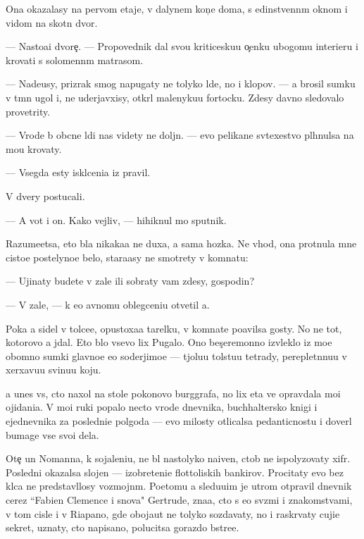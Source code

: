 \documentclass[10pt]{book}
\begin{document}
Ona okazalasy na pervom etaje, v dalynem kon{\c}e doma, s {\y}edinstvenn{\yi}m oknom i vidom na skotn{\yi}{\y} dvor.

— Nasto{\y}a{\x}i{\y} dvore{\c}. — Pro\-po\-ved\-nik dal svo{\y}u kriticesku{\y}u o{\c}enku ubogomu interieru i krovati s solomenn{\yi}m matrasom.

— Nade{\y}usy, prizrak smog napugaty ne tolyko l{\io}de{\y}, no i klopov. — {\Y}a brosil sumku v t{\e}mn{\yi}{\y} ugol i, ne uderjavxisy, otkr{\yi}l malenyku{\y}u fortocku. Zdesy davno sledovalo provetrity.

— Vrode b{\yi} ob{\yi}cn{\yi}{\y}e l{\io}di nas videty ne doljn{\yi}. — {\Y}evo pelikan{\y}e sv{\ia}\-te{\y}\-xestvo pl{\io}hnulsa na mo{\y}u krovaty.

— Vsegda {\y}esty iskl{\io}ceni{\y}a iz pravil.

V dvery postucali.

— A vot i on. Kako{\y} vejliv{\yi}{\y}, — hihiknul mo{\y} sputnik.

Razume{\y}etsa, eto b{\yi}la nikaka{\y}a ne duxa, a sama hoz{\ia}{\y}ka. Ne vhod{\ia}, ona pro\-t{\ia}\-nu\-la mne cisto{\y}e postelyno{\y}e bel{\y}o, stara{\y}asy ne smotrety v komnatu:

— Ujinaty budete v zale ili sobraty vam zdesy, gospodin?

— V zale, — k {\y}e{\y}o {\y}avnomu oblegceni{\y}u otvetil {\y}a.

Poka {\y}a sidel v tolce{\y}e, opustoxa{\y}a tarelku, v komnate po{\y}avilsa gosty. No ne tot, kotorovo {\y}a jdal. Eto b{\yi}lo vsevo lix Pugalo. Ono bes{\c}eremonno izvleklo iz mo{\y}e{\y} ob{\y}omno{\y} sumki glavno{\y}e {\y}e{\y}o soderjimo{\y}e — t{\ia}jolu{\y}u tolstu{\y}u tetrady, pereplet{\e}nnu{\y}u v xerxavu{\y}u svinu{\y}u koju.

{\Y}a unes vs{\e}, cto naxol na stole poko{\y}novo burggrafa, no lix eta ve{\x} opravdala mo{\y}i ojidani{\y}a. V mo{\y}i ruki popalo necto vrode dnevnika, buchhaltersko{\y} knigi i {\y}ejednevnika za posledni{\y}e polgoda — {\y}evo milosty otlicalsa pedanticnost{\y}u i dover{\ia}l bumage vse svo{\y}i dela.

Ote{\c} un Nomanna, k sojaleni{\y}u, ne b{\yi}l nastolyko naiven, ctob{\yi} ne ispolyzovaty xifr. Posledni{\y} okazalsa slojen — izobreteni{\y}e flottoli{\y}skih bankirov. Procitaty {\y}evo bez kl{\io}ca ne predstavl{\ia}losy vozmojn{\yi}m. Poetomu {\y}a sledu{\y}u{\x}im je utrom otpravil dnevnik cerez ``Fabien Clemence i s{\yi}nov{\y}a" Gertrude, zna{\y}a, cto s {\y}e{\y}o sv{\ia}\-z{\ia}\-mi i znakomstvami, v tom cisle i v Riapano, gde oboja{\y}ut ne tolyko sozdavaty, no i raskr{\yi}vaty cuji{\y}e sekret{\yi}, uznaty, cto napisano, polucitsa gorazdo b{\yi}stre{\y}e.
\end{document}
